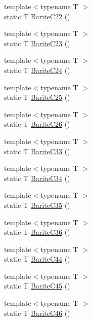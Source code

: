 \begin{DoxyCompactItemize}
\item 
{\footnotesize template$<$typename T $>$ }\\static T \mbox{\hyperlink{namespacempc_1_1data_a6f2392981b4e3e988b67d337cb2f2ab6}{Barite\+C22}} ()
\item 
{\footnotesize template$<$typename T $>$ }\\static T \mbox{\hyperlink{namespacempc_1_1data_a796e514afe3cbb3f0023235e8873ade6}{Barite\+C23}} ()
\item 
{\footnotesize template$<$typename T $>$ }\\static T \mbox{\hyperlink{namespacempc_1_1data_a0b60f305e7b237157b9b103c3b9212fa}{Barite\+C24}} ()
\item 
{\footnotesize template$<$typename T $>$ }\\static T \mbox{\hyperlink{namespacempc_1_1data_aee2546f1d2113da1dc948dd7eaae43b8}{Barite\+C25}} ()
\item 
{\footnotesize template$<$typename T $>$ }\\static T \mbox{\hyperlink{namespacempc_1_1data_aed361ccefe29a4fec9f0456cab27552e}{Barite\+C26}} ()
\item 
{\footnotesize template$<$typename T $>$ }\\static T \mbox{\hyperlink{namespacempc_1_1data_a1335f0638b10f0a8a160bce037a79338}{Barite\+C33}} ()
\item 
{\footnotesize template$<$typename T $>$ }\\static T \mbox{\hyperlink{namespacempc_1_1data_a2f2f303d1d98e3d7a9569ef790f89186}{Barite\+C34}} ()
\item 
{\footnotesize template$<$typename T $>$ }\\static T \mbox{\hyperlink{namespacempc_1_1data_ae3a53ebe8f2fea3665ab8076eda9221a}{Barite\+C35}} ()
\item 
{\footnotesize template$<$typename T $>$ }\\static T \mbox{\hyperlink{namespacempc_1_1data_a1e9b7dc514593168d0774d48d6f1af59}{Barite\+C36}} ()
\item 
{\footnotesize template$<$typename T $>$ }\\static T \mbox{\hyperlink{namespacempc_1_1data_a9296325a0efd728ab1b80650380f0fd8}{Barite\+C44}} ()
\item 
{\footnotesize template$<$typename T $>$ }\\static T \mbox{\hyperlink{namespacempc_1_1data_a3db0416d5b464e439dde18d2f120b1d1}{Barite\+C45}} ()
\item 
{\footnotesize template$<$typename T $>$ }\\static T \mbox{\hyperlink{namespacempc_1_1data_adba18f3b7a7f0cc4b67913d2b6ec0525}{Barite\+C46}} ()

\end{DoxyCompactItemize}
